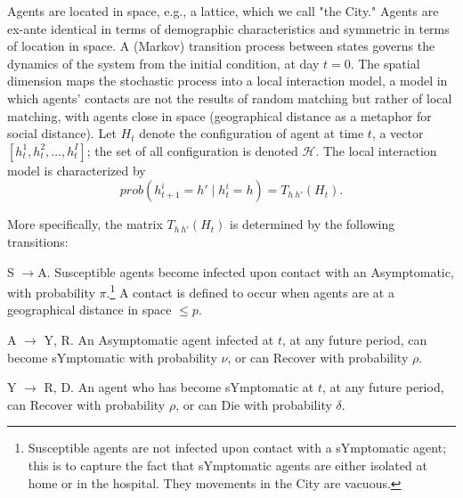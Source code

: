 \documentclass[english,11pt]{article}
\begin{document}
Agents are  located in space, e.g., a lattice, which we call "the City." Agents are ex-ante identical in terms
of demographic characteristics and symmetric in terms of location in space. %
A (Markov) transition process between states governs the dynamics
of the system from the initial condition, at day $t=0$. The spatial dimension maps the stochastic process into a local interaction model, a model in which agents' contacts are not the results of random matching but rather of local matching, with agents close in  space (geographical distance as a  metaphor for social distance).   Let $H_t $ denote the configuration of agent at time $t$, a vector $\left[h^1_t, h^2_t, \ldots, h^I_t\right]$; the set of all configuration is denoted $ \mathcal{H}$. 
The local interaction model is characterized by 
$$ prob(h^i_{t+1}=h' \mid h^i_t=h)= T_{h \: h'} ( H_t). $$ 

More specifically, the matrix $T_{h \: h'} ( H_t)$ is determined by the following transitions: 

S $\longrightarrow$A. Susceptible agents become infected
 upon contact with an Asymptomatic, with probability $\pi$.\footnote{Susceptible agents are not infected upon contact with a sYmptomatic
agent; this is to capture the fact that sYmptomatic agents are either
isolated at home or in the hospital. They movements in the City are
vacuous.}  A contact is defined to occur when agents are at a geographical distance in space $\leq p$.

A $\longrightarrow$ Y, R. An Asymptomatic agent infected
at $t$, at any future period, can become %
sYmptomatic with probability $\nu$, or can Recover with probability $\rho$.

Y $\longrightarrow$ R, D. An agent who has become sYmptomatic
at $t$, at any future period, can Recover with probability $\rho$, or can  Die with probability $\delta$. %
\end{document}
